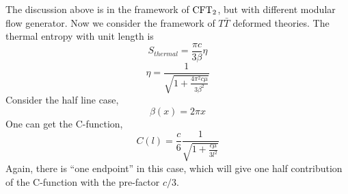 \documentclass[11pt,a4paper,utf8]{article}
\newcommand{\TTbar}{\ensuremath{T\bar{T}}\xspace}
\begin{document}
	The discussion above is in the framework of $\mathrm{CFT}_2$, but with different modular flow generator. Now we consider the framework of \TTbar deformed theories. The thermal entropy with unit length is
	\begin{equation}
	S_{thermal}=\frac{\pi c}{3\beta}\eta
	\end{equation}
	\begin{equation}
	\eta=\frac{1}{\sqrt{1+\frac{4\pi^2c\mu}{3\beta^2}}}
	\end{equation}
	Consider the half line case,
	\begin{equation}
	\beta(x)=2\pi x
	\end{equation}
	One can get the C-function,
	\begin{equation}
	C(l)=\frac{c}{6}\frac{1}{\sqrt{1+\frac{c\mu}{3l^2}}}
	\end{equation}
	Again, there is ``one endpoint'' in this case, which will give one half contribution of the C-function with the pre-factor $c/3$.
	
	
	
	
	


\FloatBarrier

\pagebreak

 

\end{document}
